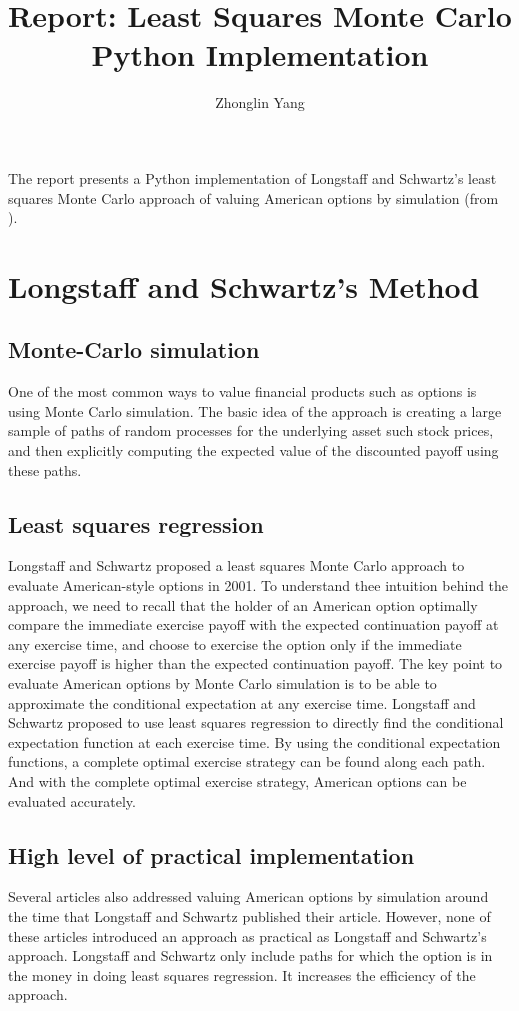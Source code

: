 \documentclass[11pt, oneside]{article}   	%
\title{ Report: Least Squares Monte Carlo Python Implementation}
\author{Zhonglin Yang}
\date{}							%
\begin{document}
\maketitle 
\noindent The report presents a Python implementation of Longstaff and Schwartz's least squares Monte Carlo approach of valuing American options by simulation 
(from \cite{10.1093/rfs/14.1.113}).
\section{Longstaff and Schwartz's Method}

\subsection{Monte-Carlo simulation}
One of the most common ways to value financial products such as options is using Monte Carlo simulation. The basic idea of the approach is creating a large sample of paths of random processes for the underlying asset such stock prices, and then explicitly computing the expected value of the discounted payoff using these paths.\subsection{Least squares regression}
Longstaff and Schwartz proposed a least squares Monte Carlo approach to evaluate American-style options in 2001. To understand thee intuition behind the approach, we need to recall that the holder of an American option optimally compare the immediate exercise payoff with the expected continuation payoff at any exercise time, and choose to exercise the option only if the immediate exercise payoff is higher than the expected continuation payoff. The key point to evaluate American options by Monte Carlo simulation is to be able to approximate the conditional expectation at any exercise time. Longstaff and Schwartz proposed to use least squares regression to directly find the conditional expectation function at each exercise time. By using the conditional expectation functions, a complete optimal exercise strategy can be found along each path. And with the complete optimal exercise strategy, American options can be evaluated accurately. 
\subsection{High level of practical implementation}
Several articles also addressed valuing American options by simulation around the time that Longstaff and Schwartz published their article. However, none of these articles introduced an approach as practical as Longstaff and Schwartz's approach. Longstaff and Schwartz only include paths for which the option is in the money in doing least squares regression. It increases the efficiency of the approach.
\end{document}
